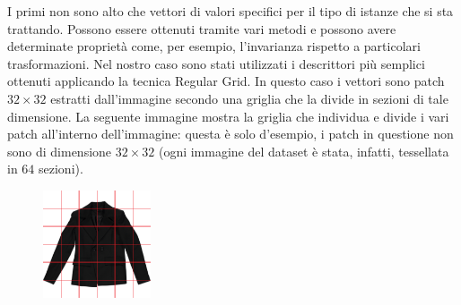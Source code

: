 \documentclass[]{report}
\begin{document}
	I primi non sono alto che vettori di valori specifici per il tipo di istanze che si sta trattando. Possono essere ottenuti tramite vari metodi e possono avere determinate proprietà come, per esempio, l'invarianza rispetto a particolari trasformazioni. Nel nostro caso sono stati utilizzati i descrittori più semplici ottenuti applicando la tecnica Regular Grid. In questo caso i vettori sono patch $32\times32$ estratti dall'immagine secondo una griglia che la divide in sezioni di tale dimensione. La seguente immagine mostra la griglia che individua e divide i vari patch all'interno dell'immagine: questa è solo d'esempio, i patch in questione non sono di dimensione $32\times32$ (ogni immagine del dataset è stata, infatti, tessellata in $64$ sezioni).
	\begin{figure}[ht!]
		\includegraphics[width=120px,height=120px]{./img/patch}
		\centering
	\end{figure}
	
\end{document}
